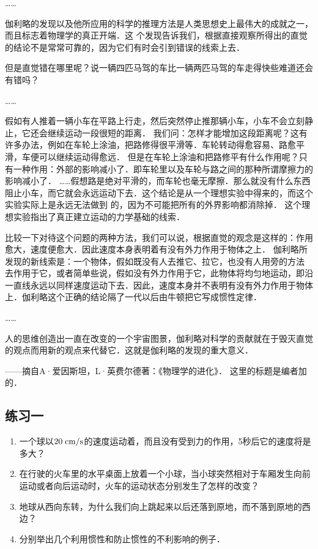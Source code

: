 ……

伽利略的发现以及他所应用的科学的推理方法是人类思想史上最伟大的成就之一，而且标志着物理学的真正开端．这
个发现告诉我们，根据直接观察所得出的直觉的结论不是常常可靠的，因为它们有时会引到错误的线索上去．

但是直觉错在哪里呢？说一辆四匹马驾的车比一辆两匹马驾的车走得快些难道还会有错吗？

……

假如有人推着一辆小车在平路上行走，然后突然停止推那辆小车，小车不会立刻静止，它还会继续运动一段很短的距离．
我们问：怎样才能增加这段距离呢？这有许多办法，例如在车轮上涂油，把路修得很平滑等．车轮转动得愈容易、路愈平滑，车便可以继续运动得愈远．
但是在车轮上涂油和把路修平有什么作用呢？只有一种作用：外部的影响减小了．即车轮里以及车轮与路之间的那种所谓摩擦力的影响减小了．
……假想路是绝对平滑的，而车轮也毫无摩擦．那么就没有什么东西阻止小车，而它就会永远运动下去．这个结论是从一个理想实验中得来的，而这个实验实际上是永远无法做到
的，因为不可能把所有的外界影响都消除掉．
这个理想实验指出了真正建立运动的力学基础的线索．

比较一下对待这个问题的两种方法，我们可以说，根据直觉的观念是这样的：作用愈大，速度便愈大．因此速度本身表明着有没有外力作用于物体之上．
伽利略所发现的新线索是：一个物体，假如既没有人去推它、拉它，也没有人用旁的方法
去作用于它，或者简单些说，假如没有外力作用于它，此物体将均匀地运动，即沿一直线永远以同样速度运动下去．因此，速度本身并不表明有没有外力作用于物体上．伽利略这个正确的结论隔了一代以后由牛顿把它写成惯性定律．

……

人的思维创造出一直在改变的一个宇宙图景，伽利略对科学的贡献就在于毁灭直觉的观点而用新的观点来代替它．这就是伽利略的发现的重大意义．


——摘自A·爱因斯坦，L·英费尔德著：《物理学的进化》．
这里的标题是编者加的．

\subsection*{练习一}
\begin{enumerate}
	 \item 一个球以$20 \;\text{cm}/\text{s}$的速度运动着，而且没有受到力的作用，5秒后它的速度将是多大？
	 \item 在行驶的火车里的水平桌面上放着一个小球，当小球突然相对于车厢发生向前运动或者向后运动时，火车的运动状态分别发生了怎样的改变？
	 \item 地球从西向东转，为什么我们向上跳起来以后还落到原地，而不落到原地的西边？
	 \item 分别举出几个利用惯性和防止惯性的不利影响的例子．
\end{enumerate}

